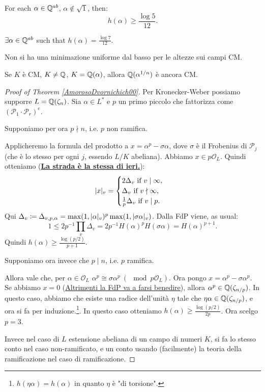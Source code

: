 \documentclass[a4paper,12pt]{article}
\newcommand{\P}{\mathcal{P}}
\begin{document}
\begin{theorem}\label{AmorosoDvornichich00}
	For each $ \alpha \in \mathbb Q^{ab}$, $\alpha \notin \sqrt{1}$, then:
	\[
	h(\alpha)\geq \frac{\log 5}{12}.
	\]
\end{theorem}
\begin{observation}
	$\exists \alpha \in \mathbb Q^{ab}$ such that $h(\alpha)=\frac{\log 7}{12}$.
\end{observation}
\begin{observation}
	Non si ha una minimazione uniforme dal basso per le altezze sui campi CM.
\end{observation}
\begin{remark}
	Se $K$ è CM, $K \neq \mathbb Q$, $K=\mathbb Q(\alpha)$, allora $\mathbb Q(\alpha^{1/n})$ è ancora CM.
\end{remark}
\begin{proof}[Proof of Theorem \ref{AmorosoDvornichich00}]
	Per Kronecker-Weber possiamo supporre $L=\mathbb Q(\zeta_n)$. Sia $\alpha \in L^*$ e $p$ un primo piccolo che fattorizza come $(\P_1\cdot \P_r)^e$. 
	
	Supponiamo per ora $p \nmid n$, i.e. $p$ non ramifica.
	
	Applicheremo la formula del prodotto a $x=\alpha^p-\sigma \alpha$, dove $\sigma$ è il Frobenius di $\P_j$ (che è lo stesso per ogni $j$, essendo $L/K$ abeliana). Abbiamo $x \in p \mathcal{O}_L$. Quindi otteniamo (\underline{\textbf{La strada è la stessa di ieri.}}):
	\[
	\lvert x\rvert_v=
	\begin{cases}
	2 \Delta_v \ \text{if } v \mid \infty,\\
	\Delta_v \ \text{if } v \nmid \infty,\\
	\frac{1}{p}\Delta_v \ \text{if } v \mid p.
	\end{cases}
	\]
	Qui $\Delta_v\coloneqq\Delta_{v,p,\alpha}=\max(1,\lvert\alpha\rvert_v)^p\max(1,\lvert\sigma \alpha\rvert_v)$. Dalla FdP viene, as usual:
	\[
	1 \leq 2p^{-1}\prod_v \Delta_v=2p^{-1}H(\alpha)^pH(\sigma \alpha)=H(\alpha)^{p+1}.
	\]
	Quindi $h(\alpha)\geq \frac{\log (p/2)}{p+1}$.
	
	Supponiamo ora invece che $p \mid n$, i.e. $p$ ramifica.
	
	Allora vale che, per $\alpha \in \mathcal{O}_L$ $\alpha^p \cong \sigma \alpha^p \ (\mod p\mathcal{O}_L)$. Ora pongo $x=\alpha^p-\sigma \alpha^p$. Se abbiamo $x=0$ (\underline{Altrimenti la FdP va a farsi benedire}), allora $\alpha ^p \in \mathbb Q(\zeta_{n/p})$. In questo caso, abbiamo che esiste una radice dell'unità $\eta$ tale che $\eta \alpha \in \mathbb Q(\zeta_{n/p})$, e ora si fa per induzione.\footnote{$h(\eta \alpha)=h(\alpha)$ in quanto $\eta$ è "di torsione".}. In questo caso otteniamo $h(\alpha) \geq \frac{\log (p/2)}{2p}$. Ora scelgo $p=3$.
	
	Invece nel caso di $L$ estensione abeliana di un campo di numeri $K$, si fa lo stesso conto nel caso non-ramificato, e un conto usando (facilmente) la teoria della ramificazione nel caso di ramificazione.
\end{proof}
\end{document}
